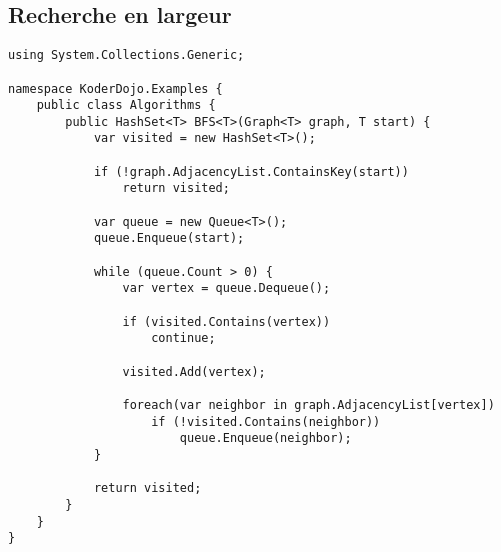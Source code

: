\newpage
\subsection{Recherche en largeur \cite{Algorithm1}}
\begin{lstlisting}
using System.Collections.Generic;

namespace KoderDojo.Examples {
    public class Algorithms {
        public HashSet<T> BFS<T>(Graph<T> graph, T start) {
            var visited = new HashSet<T>();

            if (!graph.AdjacencyList.ContainsKey(start))
                return visited;
                
            var queue = new Queue<T>();
            queue.Enqueue(start);

            while (queue.Count > 0) {
                var vertex = queue.Dequeue();

                if (visited.Contains(vertex))
                    continue;

                visited.Add(vertex);

                foreach(var neighbor in graph.AdjacencyList[vertex])
                    if (!visited.Contains(neighbor))
                        queue.Enqueue(neighbor);
            }

            return visited;
        }
    }
}
\end{lstlisting}

\newpage
